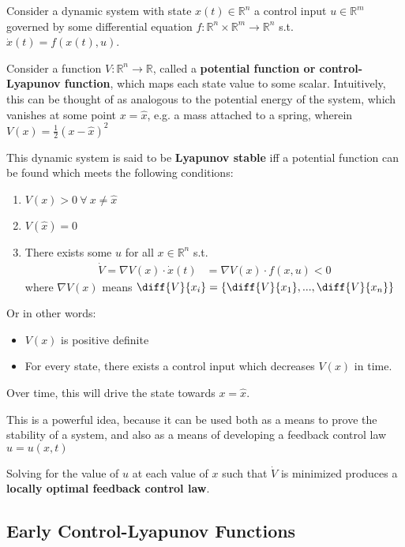 Consider a dynamic system with state $x(t) \in \mathbb{R}^n$ a control input $u \in \mathbb{R}^m$ governed by some differential equation $f : \mathbb{R}^n \times \mathbb{R}^m \to \mathbb{R}^n$ s.t. $\dot{x}(t) = f(x(t), u)$.

Consider a function $V: \mathbb{R}^n \to \mathbb{R}$, called a \textbf{potential function or control-Lyapunov function}, which maps each state value to some scalar. Intuitively, this can be thought of as analogous to the potential energy of the system, which vanishes at some point $x = \hat{x}$, e.g. a mass attached to a spring, wherein $V(x) = \frac{1}{2}(x-\hat{x})^2$

This dynamic system is said to be \textbf{Lyapunov stable} iff a potential function can be found which meets the following conditions:
\begin{enumerate}
  \item $V(x) > 0\  \forall \ x \neq \hat{x}$
  \item $V(\hat{x}) = 0$
  \item There exists some $u$ for all $x \in \mathbb{R}^n$ s.t.
        \begin{align*}
          \dot{V}= \nabla V(x) \cdot \dot{x}(t) & = \nabla V(x) \cdot f(x, u) < 0
        \end{align*}
        where $\nabla V(x)$ means $\diff{V}{{x_i}} = \left\{\diff{V}{{x_1}}, ..., \diff{V}{{x_n}}  \right\}$
\end{enumerate}
Or in other words:
\begin{itemize}
  \item $V(x)$ is positive definite
  \item For every state, there exists a control input which decreases $V(x)$ in time.
\end{itemize}

Over time, this will drive the state towards $x = \hat{x}$.

This is a powerful idea, because it can be used both as a means to prove the stability of a system, and also as a means of developing a feedback control law $u = u(x, t)$

Solving for the value of $u$ at each value of $x$ such that $\dot{V}$ is minimized produces a \textbf{locally optimal feedback control law}.

\subsection{Early Control-Lyapunov Functions}


